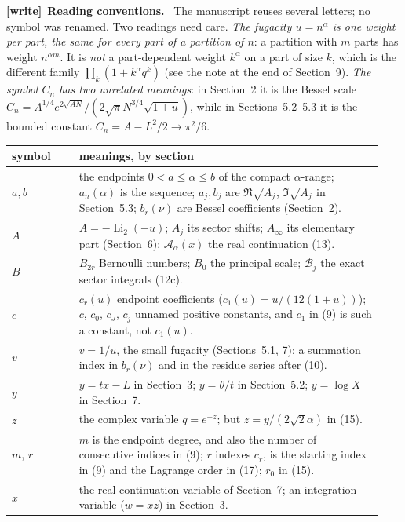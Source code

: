 \documentclass[11pt,letterpaper]{article}
\newenvironment{writenote}[1][]{\par\smallskip\begingroup\small
 \noindent\textbf{[write]}\if\relax\detokenize{#1}\relax\else~\textbf{#1.}\fi\ }%
 {\par\endgroup\smallskip}
\begin{document}
\begin{writenote}[Reading conventions]
The manuscript reuses several letters; no symbol was renamed. Two readings
need care. \emph{The fugacity $u=n^\alpha$ is one weight per part, the
same for every part of a partition of $n$}: a partition with $m$ parts has
weight $n^{\alpha m}$. It is \emph{not} a part-dependent weight $k^\alpha$
on a part of size $k$, which is the different family $\prod_k(1+k^\alpha
q^k)$ (see the note at the end of Section~9). \emph{The symbol $C_n$ has
two unrelated meanings}: in Section~2 it is the Bessel scale
$C_n=A^{1/4}e^{2\sqrt{AN}}/(2\sqrt\pi N^{3/4}\sqrt{1+u})$, while in
Sections~5.2--5.3 it is the bounded constant $C_n=A-L^2/2\to\pi^2/6$.

\smallskip
\noindent\begin{tabular}{@{}>{\raggedright\arraybackslash}p{0.17\linewidth}
 >{\raggedright\arraybackslash}p{0.77\linewidth}@{}}
\toprule
symbol & meanings, by section \\
\midrule
$a,b$ & the endpoints $0<a\le\alpha\le b$ of the compact $\alpha$-range;
 $a_n(\alpha)$ is the sequence; $a_j,b_j$ are $\Re\sqrt{A_j}$,
 $\Im\sqrt{A_j}$ in Section~5.3; $b_r(\nu)$ are Bessel coefficients
 (Section~2). \\
$A$ & $A=-\operatorname{Li}_2(-u)$; $A_j$ its sector shifts; $A_\infty$ its
 elementary part (Section~6); $\mathcal A_\alpha(x)$ the real continuation
 (13). \\
$B$ & $B_{2r}$ Bernoulli numbers; $B_0$ the principal scale; $\mathcal B_j$
 the exact sector integrals (12c). \\
$c$ & $c_r(u)$ endpoint coefficients ($c_1(u)=u/(12(1+u))$); $c$, $c_0$,
 $c_J$, $c_j$ unnamed positive constants, and $c_1$ in (9) is such a
 constant, not $c_1(u)$. \\
$v$ & $v=1/u$, the small fugacity (Sections~5.1, 7); a summation index in
 $b_r(\nu)$ and in the residue series after (10). \\
$y$ & $y=tx-L$ in Section~3; $y=\theta/t$ in Section~5.2; $y=\log X$ in
 Section~7. \\
$z$ & the complex variable $q=e^{-z}$; but $z=y/(2\sqrt2\alpha)$ in (15). \\
$m$, $r$ & $m$ is the endpoint degree, and also the number of consecutive
 indices in (9); $r$ indexes $c_r$, is the starting index in (9) and the
 Lagrange order in (17); $r_0$ in (15). \\
$x$ & the real continuation variable of Section~7; an integration variable
 ($w=xz$) in Section~3. \\

\end{tabular}
\end{writenote}
\end{document}
